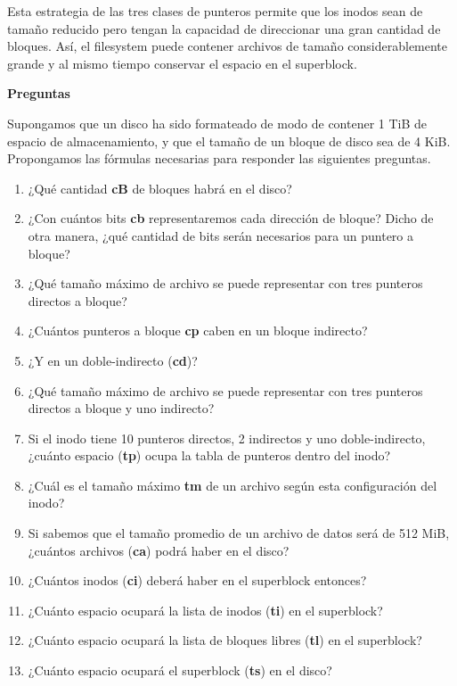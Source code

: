 \documentclass[spanish,A4,]{article}
\begin{document}
Esta estrategia de las tres clases de punteros permite que los inodos
sean de tamaño reducido pero tengan la capacidad de direccionar una gran
cantidad de bloques. Así, el filesystem puede contener archivos de
tamaño considerablemente grande y al mismo tiempo conservar el espacio
en el superblock.

\textbf{Preguntas}

Supongamos que un disco ha sido formateado de modo de contener 1 TiB de
espacio de almacenamiento, y que el tamaño de un bloque de disco sea de
4 KiB. Propongamos las fórmulas necesarias para responder las siguientes
preguntas.

\begin{enumerate}
\def\labelenumi{\arabic{enumi}.}
\itemsep1pt\parskip0pt
\item
  ¿Qué cantidad \textbf{cB} de bloques habrá en el disco?
\item
  ¿Con cuántos bits \textbf{cb} representaremos cada dirección de
  bloque? Dicho de otra manera, ¿qué cantidad de bits serán necesarios
  para un puntero a bloque?
\item
  ¿Qué tamaño máximo de archivo se puede representar con tres punteros
  directos a bloque?
\item
  ¿Cuántos punteros a bloque \textbf{cp} caben en un bloque indirecto?
\item
  ¿Y en un doble-indirecto (\textbf{cd})?
\item
  ¿Qué tamaño máximo de archivo se puede representar con tres punteros
  directos a bloque y uno indirecto?
\item
  Si el inodo tiene 10 punteros directos, 2 indirectos y uno
  doble-indirecto, ¿cuánto espacio (\textbf{tp}) ocupa la tabla de
  punteros dentro del inodo?
\item
  ¿Cuál es el tamaño máximo \textbf{tm} de un archivo según esta
  configuración del inodo?
\item
  Si sabemos que el tamaño promedio de un archivo de datos será de 512
  MiB, ¿cuántos archivos (\textbf{ca}) podrá haber en el disco?
\item
  ¿Cuántos inodos (\textbf{ci}) deberá haber en el superblock entonces?
\item
  ¿Cuánto espacio ocupará la lista de inodos (\textbf{ti}) en el
  superblock?
\item
  ¿Cuánto espacio ocupará la lista de bloques libres (\textbf{tl}) en el
  superblock?
\item
  ¿Cuánto espacio ocupará el superblock (\textbf{ts}) en el disco?
\end{enumerate}
\end{document}
